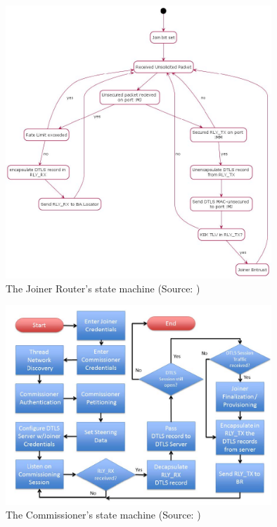 \begin{figure}[!ht]
    \centering
    \includegraphics[width=100mm, keepaspectratio]{figures/joiner-rt-smFinal_12639Thread_1.3.jpg}
    \caption{The Joiner Router's state machine (Source: \cite{thread:130})}
    \label{fig:ot:joiner-rt-sm}
\end{figure}

\begin{figure}[!ht]
    \centering
    \includegraphics[width=100mm, keepaspectratio]{figures/commissioner-sm-Final_12639Thread_1.3.jpg}
    \caption{The Commissioner's state machine (Source: \cite{thread:130})}
    \label{fig:ot:commissioner-sm}
\end{figure}

